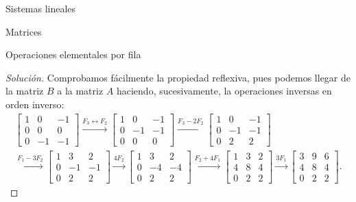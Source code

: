 \begin{chapter}{Sistemas lineales}
\begin{section}{Matrices}
\begin{subsection}{Operaciones elementales por fila}
\begin{proof}[Solución]
                    Comprobamos fácilmente la propiedad reflexiva, pues podemos llegar de la matriz $B$ a la matriz $A$ haciendo, sucesivamente, la operaciones inversas en orden inverso:
                    \begin{multline*}
                    \begin{bmatrix}1 & 0& -1 \\ 0&0&0\\  0&-1&-1 \end{bmatrix}
                    \stackrel{F_3\leftrightarrow F_2}{\longrightarrow} 
                    \begin{bmatrix}1 & 0& -1 \\ 0&-1&-1 \\ 0&0&0 \end{bmatrix}
                    \stackrel{F_3 - 2F_2}{\longrightarrow} 
                    \begin{bmatrix}1 & 0& -1 \\ 0&-1&-1 \\ 0&2&2 \end{bmatrix} 
                    \\ \stackrel{F_1 - 3F_2}{\longrightarrow}
                    \begin{bmatrix}1 & 3 & 2 \\ 0&-1&-1 \\ 0&2&2 \end{bmatrix}
                    \stackrel{4F_2}{\longrightarrow} 
                    \begin{bmatrix}1 & 3 & 2 \\ 0&-4&-4 \\ 0&2&2 \end{bmatrix} 
                    \stackrel{F_2 +4F_1}{\longrightarrow} 
                    \begin{bmatrix} 1 & 3 & 2 \\ 4&8&4 \\ 0&2&2\end{bmatrix} 
                    \stackrel{3F_1}{\longrightarrow} 
                    \begin{bmatrix} 3 & 9 & 6 \\ 4&8&4 \\ 0&2&2 \end{bmatrix}.
                    \end{multline*}
                \end{proof}


\end{subsection}
\end{section}
\end{chapter}

